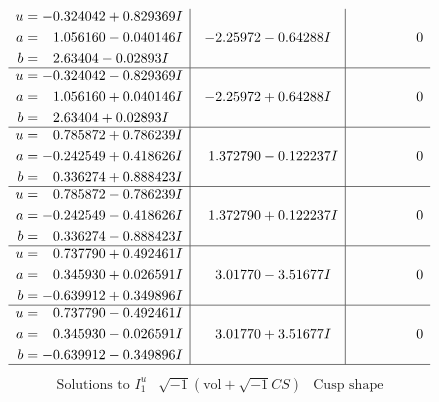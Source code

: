 \documentclass[1p]{elsarticle_modified}
\theoremstyle{definition}
\newcommand{\I}{\sqrt{-1}}
\begin{document}
$$\begin{array}{c|c|c}
\begin{aligned}
u &= -0.324042 + 0.829369 I \\
a &= \phantom{-}1.056160 - 0.040146 I \\
b &= \phantom{-}2.63404 - 0.02893 I\end{aligned}
 & -2.25972 - 0.64288 I & \phantom{-0.000000 } 0 \\ \hline\begin{aligned}
u &= -0.324042 - 0.829369 I \\
a &= \phantom{-}1.056160 + 0.040146 I \\
b &= \phantom{-}2.63404 + 0.02893 I\end{aligned}
 & -2.25972 + 0.64288 I & \phantom{-0.000000 } 0 \\ \hline\begin{aligned}
u &= \phantom{-}0.785872 + 0.786239 I \\
a &= -0.242549 + 0.418626 I \\
b &= \phantom{-}0.336274 + 0.888423 I\end{aligned}
 & \phantom{-}1.372790 - 0.122237 I & \phantom{-0.000000 } 0 \\ \hline\begin{aligned}
u &= \phantom{-}0.785872 - 0.786239 I \\
a &= -0.242549 - 0.418626 I \\
b &= \phantom{-}0.336274 - 0.888423 I\end{aligned}
 & \phantom{-}1.372790 + 0.122237 I & \phantom{-0.000000 } 0 \\ \hline\begin{aligned}
u &= \phantom{-}0.737790 + 0.492461 I \\
a &= \phantom{-}0.345930 + 0.026591 I \\
b &= -0.639912 + 0.349896 I\end{aligned}
 & \phantom{-}3.01770 - 3.51677 I & \phantom{-0.000000 } 0 \\ \hline\begin{aligned}
u &= \phantom{-}0.737790 - 0.492461 I \\
a &= \phantom{-}0.345930 - 0.026591 I \\
b &= -0.639912 - 0.349896 I\end{aligned}
 & \phantom{-}3.01770 + 3.51677 I & \phantom{-0.000000 } 0\\
 \hline 
 \end{array}$$\newpage$$\begin{array}{c|c|c}  
\text{Solutions to }I^u_{1}& \I (\text{vol} + \sqrt{-1}CS) & \text{Cusp shape}\\

\end{array}$$
\end{document}
